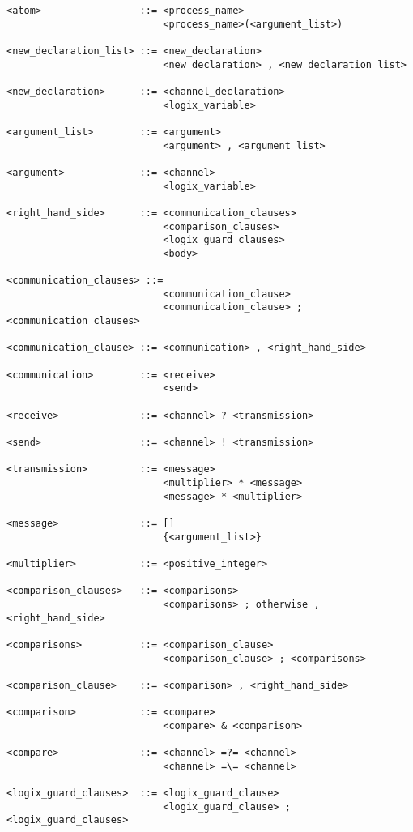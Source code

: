 \begin{verbatim}
<atom>                 ::= <process_name>
                           <process_name>(<argument_list>)

<new_declaration_list> ::= <new_declaration>
                           <new_declaration> , <new_declaration_list>

<new_declaration>      ::= <channel_declaration>
                           <logix_variable>

<argument_list>        ::= <argument>
                           <argument> , <argument_list>

<argument>             ::= <channel>
                           <logix_variable>

<right_hand_side>      ::= <communication_clauses>
                           <comparison_clauses>
                           <logix_guard_clauses>
                           <body>

<communication_clauses> ::= 
                           <communication_clause> 
                           <communication_clause> ; <communication_clauses>

<communication_clause> ::= <communication> , <right_hand_side>

<communication>        ::= <receive>
                           <send>

<receive>              ::= <channel> ? <transmission>

<send>                 ::= <channel> ! <transmission>

<transmission>         ::= <message>
                           <multiplier> * <message>
                           <message> * <multiplier>

<message>              ::= []
                           {<argument_list>}

<multiplier>           ::= <positive_integer>

<comparison_clauses>   ::= <comparisons>
                           <comparisons> ; otherwise , <right_hand_side>

<comparisons>          ::= <comparison_clause>
                           <comparison_clause> ; <comparisons>

<comparison_clause>    ::= <comparison> , <right_hand_side>

<comparison>           ::= <compare>
                           <compare> & <comparison>

<compare>              ::= <channel> =?= <channel>
                           <channel> =\= <channel>

<logix_guard_clauses>  ::= <logix_guard_clause> 
                           <logix_guard_clause> ; <logix_guard_clauses>


\end{verbatim}

